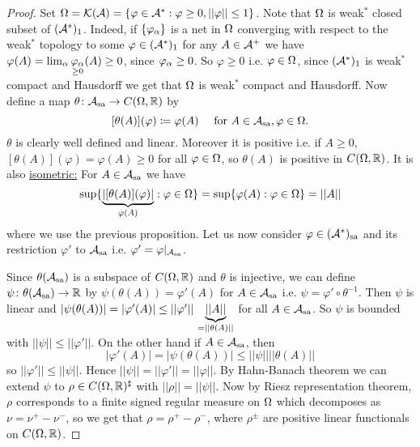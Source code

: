 \documentclass[10pt,english,a4paper]{article}
\theoremstyle{definition}
\def\Assa{\As_{\text{sa}}}
\def\sa{\text{sa}}
\def\vphi{\varphi}
\begin{document}
\begin{proof}
    Set $\Om = \Ks(\As) = \{\vphi \in \As^* : \vphi\geq 0, ||\vphi||\leq 1\}$.
    Note that $\Omega$ is weak$^*$ closed subset of $(\mathcal{A}^*)_{1}$. Indeed, if 
    $\{\vphi_{\al}\}$ is a net in $\Omega$ converging with respect to
    the weak$^*$ topology to some $\vphi \in (\As^*)_1$
    for any $A \in \mathcal{A}^+$ we have $\vphi(A) = \lim_{\al} \underset{\geq
    0}{\vphi_{\al}} (A)\geq 0$, since $\vphi_{\al}\geq 0$.
    So $\vphi\geq 0$ i.e. $\vphi \in \Om$, since $(\mathcal{A}^*)_1$ is weak$^*$ compact
    and Hausdorff we get that $\Omega$ is weak$^*$ compact and Hausdorff. Now
    define a map $\theta \colon \Assa \to C(\Om,\R)$ by 
    \[ [\theta(A)](\vphi)\coloneqq \vphi(A) \quad \text{ for }A\in \Assa, \vphi\in \Om.\]
    $\theta$ is clearly well defined and linear. Moreover it is positive i.e.
    if $A\geq 0$, $[\theta(A)](\vphi) = \vphi(A)\geq 0$ for all $\vphi \in
    \Om$, so $\theta (A)$ is positive in $C(\Omega,\mathbb{R})$. It is also \ul{isometric:} 
    For $A \in \Assa$ we have 
    \[ \sup\{ \ub{|[\theta(A)](\vphi)|}_{\vphi(A)} : \vphi \in \Om \} 
    =\sup\{ \vphi(A) : \vphi \in \Om \} = ||A|| 
    \] 
    where we use the previous proposition. 
    Let us now consider $\vphi \in (\As^*)_{\sa}$ and its restriction 
    $\vphi'$ to $\Assa$ i.e. $\vphi' = \vphi\lvert_{\Assa}$.
    
    \begin{center}
    \end{center}    


    Since $\theta(\Assa)$ is a subspace of $C(\Omega,\mathbb{R})$ and $\theta$ is injective,
    we can define $\psi \colon \theta(\Assa) \to \R$ by 
$\psi(\theta(A)) = \vphi'(A)$ for $A\in \Assa$ i.e. $\psi = \vphi' \circ \theta^{-1}$.
Then $\psi$ is linear and $|\psi(\theta(A))| = |\vphi'(A)| \leq
||\vphi'||\,\ub{||A||}_{=||\theta(A)||} $ for all $A \in \Assa$.
So $\psi$ is bounded with $||\psi|| \leq||\vphi'||$. On the other hand if $A
\in \Assa$, then
\[ |\vphi'(A)| = |\psi(\theta(A))| \leq ||\psi|| ||\theta(A)||\]
so $||\vphi'||\leq ||\psi||$. Hence 
$||\psi|| = ||\vphi'|| = ||\vphi||$. By Hahn-Banach theorem we can extend
$\psi$ to $\rho \in C(\Omega,\mathbb{R})^{\sharp}$ with $||\rho || = ||\psi||$.
Now by Riesz representation theorem, $\rho$ corresponds to a finite 
signed regular measure on $\Omega$ which decomposes as $\nu =\nu^+-\nu^-$,
so we get that $\rho =\rho^+ - \rho^-$, where $\rho^{\pm}$ are positive linear functionals
on $C(\Omega,\mathbb{R})$. 


\end{proof}
\end{document}
